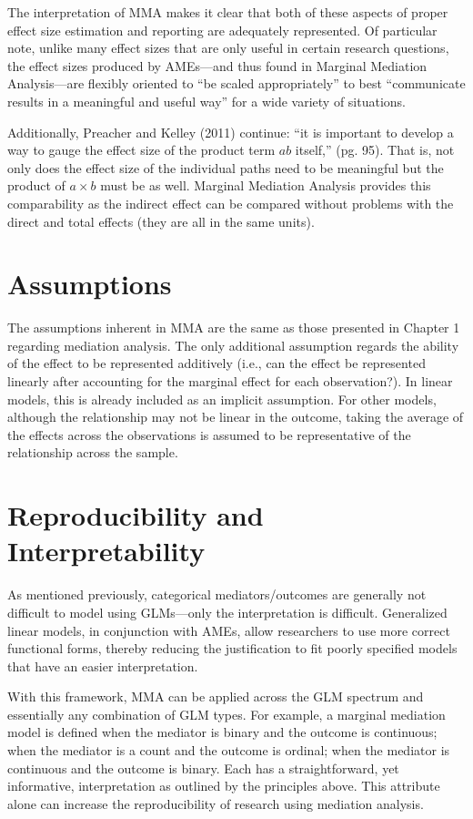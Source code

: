 \documentclass[]{DissertateUSU}
\begin{document}
The interpretation of MMA makes it clear that both of these aspects of
proper effect size estimation and reporting are adequately represented.
Of particular note, unlike many effect sizes that are only useful in
certain research questions, the effect sizes produced by AMEs---and thus
found in Marginal Mediation Analysis---are flexibly oriented to ``be
scaled appropriately'' to best ``communicate results in a meaningful and
useful way'' for a wide variety of situations.

Additionally, Preacher and Kelley (2011) continue: ``it is important to
develop a way to gauge the effect size of the product term \(ab\)
itself,'' (pg. 95). That is, not only does the effect size of the
individual paths need to be meaningful but the product of \(a \times b\)
must be as well. Marginal Mediation Analysis provides this comparability
as the indirect effect can be compared without problems with the direct
and total effects (they are all in the same units).

\section{Assumptions}\label{assumptions}

The assumptions inherent in MMA are the same as those presented in
Chapter 1 regarding mediation analysis. The only additional assumption
regards the ability of the effect to be represented additively (i.e.,
can the effect be represented linearly after accounting for the marginal
effect for each observation?). In linear models, this is already
included as an implicit assumption. For other models, although the
relationship may not be linear in the outcome, taking the average of the
effects across the observations is assumed to be representative of the
relationship across the sample.

\section{Reproducibility and
Interpretability}\label{reproducibility-and-interpretability}

As mentioned previously, categorical mediators/outcomes are generally
not difficult to model using GLMs---only the interpretation is
difficult. Generalized linear models, in conjunction with AMEs, allow
researchers to use more correct functional forms, thereby reducing the
justification to fit poorly specified models that have an easier
interpretation.

With this framework, MMA can be applied across the GLM spectrum and
essentially any combination of GLM types. For example, a marginal
mediation model is defined when the mediator is binary and the outcome
is continuous; when the mediator is a count and the outcome is ordinal;
when the mediator is continuous and the outcome is binary. Each has a
straightforward, yet informative, interpretation as outlined by the
principles above. This attribute alone can increase the reproducibility
of research using mediation analysis.
\end{document}
